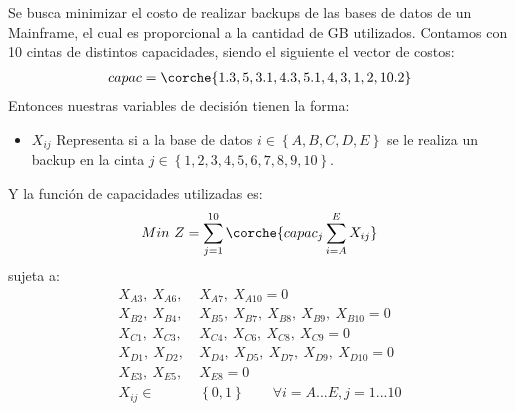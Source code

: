 

\begin{homeworkProblem}
Se busca minimizar el costo de realizar backups de las bases de datos de un Mainframe, el cual es proporcional a la cantidad de GB utilizados.
Contamos con 10 cintas de distintos capacidades, siendo el siguiente el vector de costos:
\begin{align*}
capac = \corche{1.3, 5, 3.1, 4.3, 5.1, 4, 3, 1, 2, 10.2}
\end{align*}
Entonces nuestras variables de decisión tienen la forma:
\begin{itemize}
\item $X_{ij}$ Representa si a la base de datos \( i \in \left\{ A,B,C,D,E \right\}  \) se le realiza un backup en la cinta \(  j \in \left\{ 1,2,3,4,5,6,7,8,9,10 \right\} \).
\end{itemize}
Y la función de capacidades utilizadas es:
\begin{align*}
Min\ Z = \sum_{j=1}^{10}{\corche{capac_j \sum_{i=A}^{E}{X_{ij}}}}
\end{align*}
sujeta a:
\begin{align*}
X_{A3},\    X_{A6},\ &  X_{A7},\   X_{A10} = 0  \\
X_{B2},\   X_{B4},\  &X_{B5},\  X_{B7},\  X_{B8},\   X_{B9},\  X_{B10} = 0 \\
X_{C1},\   X_{C3},\  &X_{C4},\  X_{C6},\  X_{C8},\  X_{C9} =0 \\
X_{D1},\   X_{D2},\  &X_{D4},\  X_{D5},\  X_{D7},\  X_{D9},\  X_{D10} = 0 \\
X_{E3},\   X_{E5},\  &X_{E8}  = 0 \\
X_{ij} \in & \left\{  0,1 \right\}\quad\quad \forall i=A...E,j=1...10\\
\end{align*}
\end{homeworkProblem}


